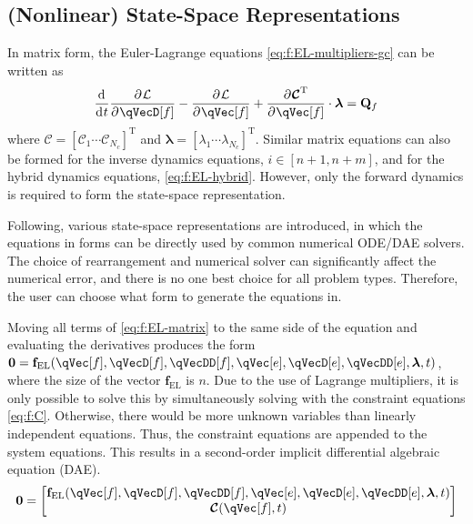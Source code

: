 \documentclass[11pt]{article}
\newcommand{\oD}[2]{
    \frac{\mathrm{d}\mspace{1mu}#1}{\mathrm{d}\mspace{1mu}#2}
}
\newcommand{\pD}[2]{
    \frac{\partial\mspace{1mu}#1}{\partial\mspace{1mu}#2}
}
\begin{document}
\subsection{(Nonlinear) State-Space Representations} \label{ssec:f:stateSpace}
In matrix form, the Euler-Lagrange equations \eqref{eq:f:EL-multipliers-gc} can be written as
\begin{equation} \label{eq:f:EL-matrix}
    \oD{}{t}\pD{\mathcal{L}}{\qVecD[f]} 
    - \pD{\mathcal{L}}{\qVec[f]}
    + \pD{\bm{\mathcal{C}}^{\mathrm{T}}}{\qVec[f]} \cdot \bm{\lambda}
    = \mathbf{Q}_f
\end{equation}
where $\bm{\mathcal{C}}=[\mathcal{C}_1 \cdots \mathcal{C}_{N_c}]^{\mathrm{T}}$ and $\bm{\lambda}=[\lambda_1 \cdots \lambda_{N_c}]^{\mathrm{T}}$. Similar matrix equations can also be formed for the inverse dynamics equations, $i\in[n+1,n+m]$, and for the hybrid dynamics equations, \eqref{eq:f:EL-hybrid}. However, only the forward dynamics is required to form the state-space representation.

Following, various state-space representations are introduced, in which the equations in forms can be directly used by common numerical ODE/DAE solvers. The choice of rearrangement and numerical solver can significantly affect the numerical error, and there is no one best choice for all problem types. Therefore, the user can choose what form to generate the equations in.

Moving all terms of \eqref{eq:f:EL-matrix} to the same side of the equation and evaluating the derivatives produces the form $\mathbf{0} = \mathbf{f}_{\mathrm{EL}}(\qVec[f], \qVecD[f], \qVecDD[f], \qVec[e], \qVecD[e], \qVecDD[e], \bm{\lambda}, t)$, where the size of the vector $\mathbf{f}_{\mathrm{EL}}$ is $n$. Due to the use of Lagrange multipliers, it is only possible to solve this by simultaneously solving with the constraint equations \eqref{eq:f:C}. Otherwise, there would be more unknown variables than linearly independent equations. Thus, the constraint equations are appended to the system equations. This results in a second-order implicit differential algebraic equation (DAE).
\begin{equation}
    \mathbf{0} = \begin{bmatrix} \mathbf{f}_{\mathrm{EL}}(\qVec[f], \qVecD[f], \qVecDD[f], \qVec[e], \qVecD[e], \qVecDD[e], \bm{\lambda}, t) \\ \bm{\mathcal{C}}(\qVec[f], t) \end{bmatrix}
\end{equation}
\end{document}
